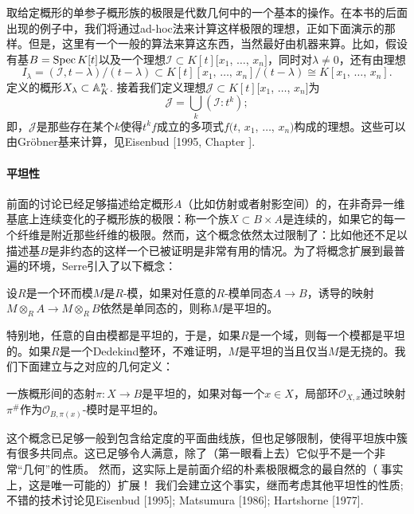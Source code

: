 取给定概形的单参子概形族的极限是代数几何中的一个基本的操作。在本书的后面出现的例子中，我们将通过ad-hoc\nottran 法来计算这样极限的理想，正如下面演示的那样。但是，这里有一个一般的算法来算这东西，当然最好由机器来算。比如，假设有基$B=\operatorname{Spec} K[t]$以及一个理想$\mathscr{I}\subset K[t][x_1$, $\dots$, $x_n]$，同时对$\lambda \neq 0$，还有由理想
\[
	I_\lambda=(\mathscr{I},t-\lambda)/(t-\lambda)\subset K[t][\text{$x_1$, $\dots$, $x_n$}]/(t-\lambda)\cong K[\text{$x_1$, $\dots$, $x_n$}].
\]
定义的概形$X_\lambda\subset \mathbb{A}_K^n$. 接着我们定义理想$\mathscr{J}\subset K[t][x_1$, $\dots$, $x_n]$为
\[
	\mathscr{J}=\bigcup_k (\mathscr{I}:t^k);
\]
即，$\mathscr{J}$是那些存在某个$k$使得$t^k f$成立的多项式$f(t$, $x_1$, $\dots$, $x_n)$构成的理想。这些可以由Gr\"{o}bner基来计算，见Eisenbud [1995, Chapter \uppercase\expandafter{}].

\paragraph*{平坦性}
前面的讨论已经足够描述给定概形$A$（比如仿射或者射影空间）的，在非奇异一维基底上连续变化的子概形族的极限：称一个族$X\subset B\times A$是连续的，如果它的每一个纤维是附近那些纤维的极限。然而，这个概念依然太过限制了：比如他还不足以描述基$B$是非约态的这样一个已被证明是非常有用的情况。为了将概念扩展到最普遍的环境，Serre引入了以下概念：

\begin{defi}
	设$R$是一个环而模$M$是$R$\hyp 模，如果对任意的$R$\hyp 模单同态$A\to B$，诱导的映射$M\otimes_R A\to M\otimes_R B$依然是单同态的，则称$M$是平坦的。
\end{defi}

特别地，任意的自由模都是平坦的，于是，如果$R$是一个域，则每一个模都是平坦的。如果$R$是一个Dedekind整环，不难证明，$M$是平坦的当且仅当$M$是无挠的。我们下面建立与之对应的几何定义：

\begin{defi}
	一族概形间的态射$\pi:X\to B$是平坦的，如果对每一个$x\in X$，局部环$\mathscr{O}_{X,x}$通过映射$\pi^\#$作为$\mathscr{O}_{B,\pi(x)}$\hyp 模时是平坦的。
\end{defi}

这个概念已足够一般到包含给定度的平面曲线族，但也足够限制，使得平坦族中簇有很多共同点。这已足够令人满意，除了（第一眼看上去）它似乎不是一个非常“几何”的性质。 然而，这实际上是前面介绍的朴素极限概念的最自然的（ 事实上，这是唯一可能的）扩展！ 我们会建立这个事实，继而考虑其他平坦性的性质; 不错的技术讨论见Eisenbud [1995]; Matsumura [1986]; Hartshorne [1977]. \nottran

